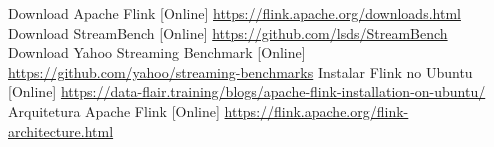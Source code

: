\documentclass[conference]{IEEEtran}
\begin{document}
\begin{thebibliography}{00}

 Download Apache Flink [Online] \url{https://flink.apache.org/downloads.html}
 Download StreamBench [Online] \url{https://github.com/lsds/StreamBench}
 Download Yahoo Streaming Benchmark [Online] \url{https://github.com/yahoo/streaming-benchmarks}
 Instalar Flink no Ubuntu [Online] \url{https://data-flair.training/blogs/apache-flink-installation-on-ubuntu/}
 Arquitetura Apache Flink [Online] \url{https://flink.apache.org/flink-architecture.html}

\end{thebibliography}
\end{document}
